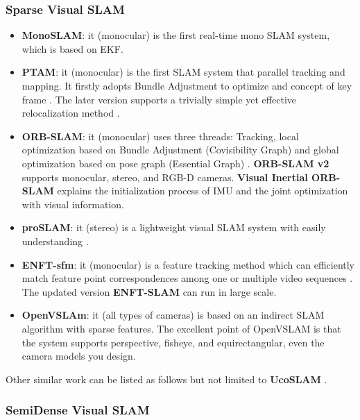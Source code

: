 \documentclass[journal,transmag]{IEEEtran}
\begin{document}
\subsubsection{Sparse Visual SLAM}
\begin{itemize}
    \item \textbf{MonoSLAM}: it (monocular) is the first real-time mono SLAM system, which is based on EKF\cite{davison2007monoslam}. 
    \item \textbf{PTAM}: it (monocular) is the first SLAM system that parallel tracking and mapping. It firstly adopts Bundle Adjustment to optimize and concept of key frame \cite{klein2007parallel}\cite{klein2009parallel}. The later version supports a trivially simple yet effective relocalization method \cite{klein2008improving}.
    \item \textbf{ORB-SLAM}: it (monocular) uses three threads: Tracking, local optimization based on Bundle Adjustment (Covisibility Graph) and global optimization based on pose graph (Essential Graph) \cite{rublee2011orb}\cite{mur2015orb}. \textbf{ORB-SLAM v2} \cite{mur2017orb} supports monocular, stereo, and RGB-D cameras. \textbf{Visual Inertial ORB-SLAM} \cite{mur2017visual}\cite{forster2016manifold} explains the initialization process of IMU and the joint optimization with visual information.
    \item \textbf{proSLAM}: it (stereo) is a lightweight visual SLAM system with easily understanding \cite{2018-schlegel-proslam}.
    \item \textbf{ENFT-sfm}: it (monocular) is a feature tracking method which can efficiently match feature point correspondences among one or multiple video sequences \cite{zhang2016efficient}. The updated version \textbf{ENFT-SLAM} can run in large scale.
    \item \textbf{OpenVSLAm}: it (all types of cameras) \cite{openvslam2019} is based on an indirect SLAM algorithm with sparse features. The excellent point of OpenVSLAM is that the system supports perspective, fisheye, and equirectangular, even the camera models you design.
\end{itemize}

Other similar work can be listed as follows but not limited to \textbf{UcoSLAM} \cite{munoz2019ucoslam}.

\subsubsection{SemiDense Visual SLAM}
\end{document}
